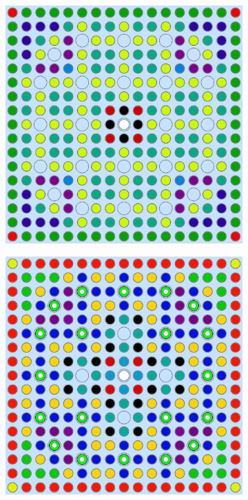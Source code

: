 \begin{figure}[h!]
\centering
\begin{subfigure}{.47\textwidth}
  \centering
  \includegraphics[width=0.9\linewidth]{figures/patterns/lns/assm-31/materials}
  \caption{}
  \label{fig:chap9-assm-31-lns-materials}
\end{subfigure}%
\begin{subfigure}{.47\textwidth}
  \centering
  \includegraphics[width=0.9\linewidth]{figures/patterns/lns/assm-31-20BPs/materials}

\end{subfigure}
\end{figure}
